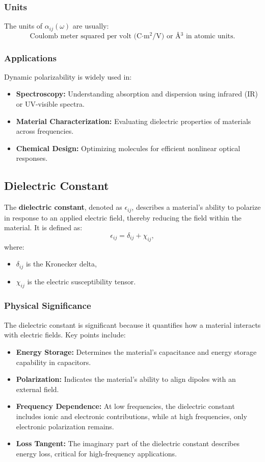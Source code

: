 \documentclass[12pt]{article}
\begin{document}
\subsubsection*{Units}
The units of $\alpha_{ij}(\omega)$ are usually:
\[
\text{Coulomb meter squared per volt (C·m$^2$/V) or Å$^3$ in atomic units.}
\]

\subsubsection*{Applications}
Dynamic polarizability is widely used in:
\begin{itemize}
    \item \textbf{Spectroscopy:} Understanding absorption and dispersion using infrared (IR) or UV-visible spectra.
    \item \textbf{Material Characterization:} Evaluating dielectric properties of materials across frequencies.
    \item \textbf{Chemical Design:} Optimizing molecules for efficient nonlinear optical responses.
\end{itemize}

\subsection*{Dielectric Constant}

The \textbf{dielectric constant}, denoted as $\epsilon_{ij}$, describes a material's ability to polarize in response to an applied electric field, thereby reducing the field within the material. It is defined as:
\[
\epsilon_{ij} = \delta_{ij} + \chi_{ij},
\]
where:
\begin{itemize}
    \item $\delta_{ij}$ is the Kronecker delta,
    \item $\chi_{ij}$ is the electric susceptibility tensor.
\end{itemize}

\subsubsection*{Physical Significance}
The dielectric constant is significant because it quantifies how a material interacts with electric fields. Key points include:
\begin{itemize}
    \item \textbf{Energy Storage:} Determines the material's capacitance and energy storage capability in capacitors.
    \item \textbf{Polarization:} Indicates the material's ability to align dipoles with an external field.
    \item \textbf{Frequency Dependence:} At low frequencies, the dielectric constant includes ionic and electronic contributions, while at high frequencies, only electronic polarization remains.
    \item \textbf{Loss Tangent:} The imaginary part of the dielectric constant describes energy loss, critical for high-frequency applications.
\end{itemize}
\end{document}
